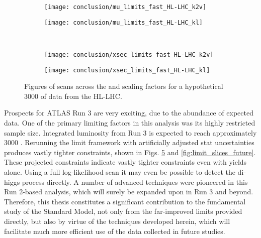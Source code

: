 \begin{figure}
    \centering
    \begin{subfigure}{0.48\textwidth} 
        \texttt{[image: conclusion/mu\_limits\_fast\_HL-LHC\_k2v]}
        \caption{}%
        \label{fig:mulimits_kvv_future}
    \end{subfigure}
    \begin{subfigure}{0.48\textwidth}
        \texttt{[image: conclusion/mu\_limits\_fast\_HL-LHC\_kl]}
        \caption{}%
        \label{fig:mulimits_kl_future}
    \end{subfigure}\\
    \begin{subfigure}{0.48\textwidth} 
        \texttt{[image: conclusion/xsec\_limits\_fast\_HL-LHC\_k2v]}
        \caption{}%
        \label{fig:xseclimits_kvv_future}
    \end{subfigure}
    \begin{subfigure}{0.48\textwidth}
        \texttt{[image: conclusion/xsec\_limits\_fast\_HL-LHC\_kl]}
        \caption{}%
        \label{fig:xseclimits_kl_future}
    \end{subfigure}
    \caption{
        Figures of scans across the \kvv and \kl scaling factors
            for a hypothetical 3000 \ifb of data from the HL-LHC.
    }
    \label{fig:mu_xsec_future}
\end{figure}

Prospects for ATLAS Run 3 are very exciting, due to the abundance of expected data.
One of the primary limiting factors in this analysis was its highly restricted sample size.
Integrated luminosity from Run 3 is expected to reach approximately 3000 \ifb.
Rerunning the limit framework with artificially adjusted stat uncertainties produces vastly tighter constraints,
    shown in Figs. \ref{fig:mu_xsec_future} and \ref{fig:limit_slices_future}.
These projected constraints indicate vastly tighter constraints even with yields alone.
Using a full log-likelihood scan it may even be possible to detect the di-higgs process directly.
A number of advanced techniques were pioneered in this Run 2-based analysis,
    which will surely be expanded upon in Run 3 and beyond.
Therefore, this thesis constitutes a significant contribution to the fundamental study of the Standard Model,
    not only from the far-improved limits provided directly,
    but also by virtue of the techniques developed herein,
    which will facilitate much more efficient use of the data collected in future studies.


